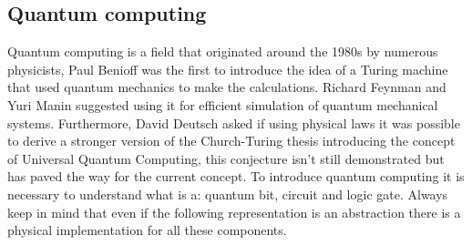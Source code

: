 \subsection{Quantum computing}
Quantum computing is a field that originated around the 1980s by numerous physicists, Paul Benioff was the first to introduce the idea of a Turing machine that used quantum mechanics to make the calculations. Richard Feynman and Yuri Manin suggested using it for efficient simulation of quantum mechanical systems. Furthermore, David Deutsch asked if using physical laws it was possible to derive a stronger version of the Church-Turing thesis introducing the concept of Universal Quantum Computing, this conjecture isn't still demonstrated but has paved the way for the current concept. To introduce quantum computing it is necessary to understand what is a: quantum bit, circuit and logic gate. Always keep in mind that even if the following representation is an abstraction there is a physical implementation for all these components.

